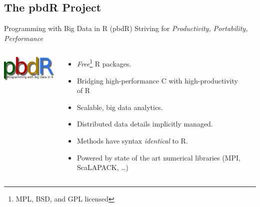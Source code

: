 \subsection{The pbdR Project}


\begin{frame}
  \begin{block}{Programming with Big Data in R (pbdR)}
       \centering Striving for \emph{Productivity, Portability, Performance}\\[.4cm]\pause
  \begin{columns}[onlytextwidth]
    \begin{column}{0.30\textwidth}
      \centering
       \includegraphics[width=3.4cm]{../common/pics/simple}\\[.2cm]
    \end{column}
    \begin{column}{0.65\textwidth}
  \begin{itemize}[<+-|alert@+>]
    \item \emph{Free}\footnote{MPL, BSD, and GPL licensed} R packages.
    \item Bridging high-performance C with high-productivity of R
    \item Scalable, big data analytics.
    \item Distributed data details implicitly managed.
    \item Methods have syntax \emph{identical} to R.
    \item Powered by state of the art numerical libraries (MPI, ScaLAPACK, \dots)
  \end{itemize}
    \end{column}
​  \end{columns}
\end{block}
\end{frame}




